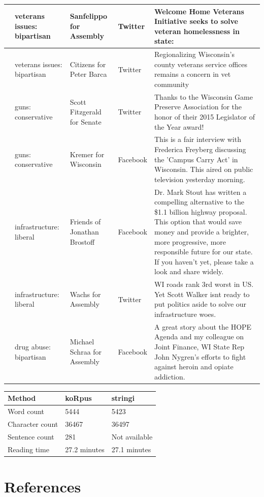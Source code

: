 \documentclass[12pt,]{article}
\begin{document}
\begin{longtable}[t]{>{\raggedright\arraybackslash}p{.65in}|>{\raggedright\arraybackslash}p{.6in}|>{\raggedright\arraybackslash}p{.7in}|>{\raggedright\arraybackslash}p{.6in}|>{\raggedright\arraybackslash}p{3in}}
\hline
6 & veterans issues: bipartisan & Sanfelippo for Assembly & Twitter & Welcome Home Veterans Initiative seeks to solve veteran homelessness in state:\\
\hline
7 & veterans issues: bipartisan & Citizens for Peter Barca & Twitter & Regionalizing Wisconsin's county veterans service offices remains a concern in vet community\\
\hline
8 & guns: conservative & Scott Fitzgerald for Senate & Twitter & Thanks to the Wisconsin Game Preserve Association for the honor of their 2015 Legislator of the Year award!\\
\hline
9 & guns: conservative & Kremer for Wisconsin & Facebook & This is a fair interview with Frederica Freyberg discussing the 'Campus Carry Act' in Wisconsin.  This aired on public television yesterday morning.\\
\hline
10 & infrastructure: liberal & Friends of Jonathan Brostoff & Facebook & Dr. Mark Stout has written a compelling alternative to the \$1.1 billion highway proposal. This option that would save money and provide a brighter, more progressive, more responsible future for our state. If you haven't yet, please take a look and share widely.\\
\hline
11 & infrastructure: liberal & Wachs for Assembly & Twitter & WI roads rank 3rd worst in US. Yet Scott Walker isnt ready to put politics aside to solve our infrastructure woes.\\
\hline
12 & drug abuse: bipartisan & Michael Schraa for Assembly & Facebook & A great story about the HOPE Agenda and my colleague on Joint Finance, WI State Rep John Nygren's efforts to fight against heroin and opiate addiction.\\
\hline
\end{longtable}

\begin{tabular}{l|l|l}
\hline
Method & koRpus & stringi\\
\hline
Word count & 5444 & 5423\\
\hline
Character count & 36467 & 36497\\
\hline
Sentence count & 281 & Not available\\
\hline
Reading time & 27.2 minutes & 27.1 minutes\\
\hline
\end{tabular}

\hypertarget{references}{%
\section*{References}\label{references}}
\end{document}
